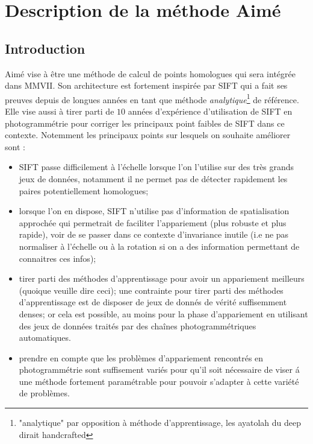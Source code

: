 
\chapter{Description de la m\'ethode Aim\'e}

\section{Introduction}

Aim\'e vise à \^etre une m\'ethode de calcul de points homologues qui sera  int\'egr\'ee dans MMVII. 
Son architecture est fortement inspir\'ee par SIFT qui a fait ses preuves depuis de longues
ann\'ees en tant que m\'ethode \emph{analytique}\footnote{"analytique" par opposition à m\'ethode d'apprentissage,
les ayatolah du deep dirait handcrafted} de r\'ef\'erence. Elle vise aussi à tirer parti de $10$ ann\'ees
d'exp\'erience d'utilisation de SIFT en photogramm\'etrie pour corriger les principaux point faibles
de SIFT dans ce contexte.  Notemment les principaux points  sur lesquels on souhaite am\'eliorer sont :


\begin{itemize}
   \item SIFT passe difficilement à l'\'echelle lorsque  l'on l'utilise sur des tr\`es grands jeux de donn\'ees,
         notamment il ne permet pas de d\'etecter rapidement les paires potentiellement homologues;

   \item lorsque l'on en dispose, SIFT n'utilise pas d'information  de spatialisation approch\'ee qui permetrait
         de faciliter l'appariement (plus robuste et plus rapide), voir de se passer dans ce contexte d'invariance
         inutile (i.e ne pas normaliser à l'\'echelle ou à la rotation si on a des information permettant de
         connaitres ces infos);

   \item tirer parti des m\'ethodes d'apprentissage pour avoir un appariement meilleurs (quoique veuille dire
         ceci); une contrainte pour tirer parti des m\'ethodes d'apprentissage est de disposer de  jeux de
         donn\'es de v\'erit\'e suffisemment denses; or cela est possible, au moins pour la phase d'appariement 
         en utilisant des jeux de donn\'ees trait\'es par des cha\^ines photogramm\'etriques automatiques.

   \item prendre en compte que les probl\`emes d'appariement rencontr\'es en photogramm\'etrie sont
         suffisement vari\'es pour qu'il soit n\'ecessaire de viser \'a une m\'ethode fortement param\'etrable
         pour pouvoir s'adapter \`a cette vari\'et\'e de probl\`emes.


\end{itemize}

